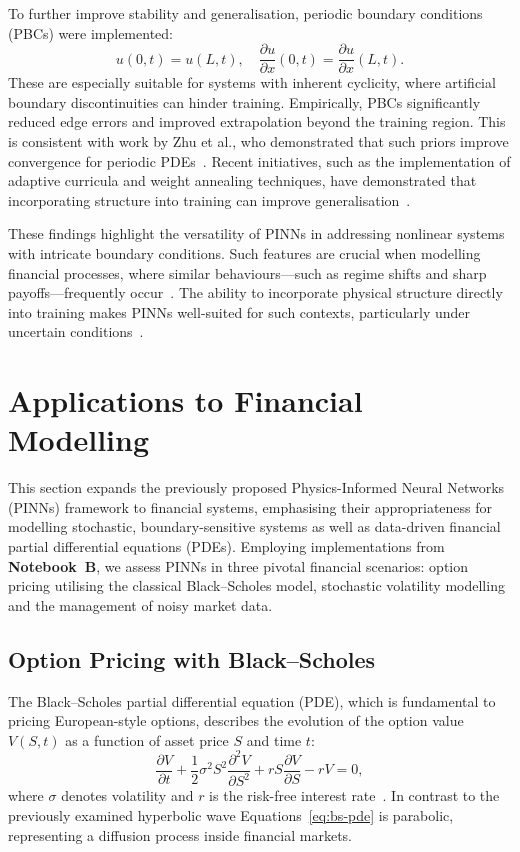 \documentclass[12pt,a4paper]{article}
\begin{document}
To further improve stability and generalisation, periodic boundary conditions (PBCs) were implemented:
\begin{equation}
u(0,t) = u(L,t),\quad \frac{\partial u}{\partial x}(0,t) = \frac{\partial u}{\partial x}(L,t).
\label{eq:pbc-condition}
\end{equation}
These are especially suitable for systems with inherent cyclicity, where artificial boundary discontinuities can hinder training. Empirically, PBCs significantly reduced edge errors and improved extrapolation beyond the training region. This is consistent with work by Zhu et al., who demonstrated that such priors improve convergence for periodic PDEs~\cite{zhu2022periodic}. Recent initiatives, such as the implementation of adaptive curricula and weight annealing techniques, have demonstrated that incorporating structure into training can improve generalisation~\cite{goswami2022adaptive, jagtap2020adaptive}.

These findings highlight the versatility of PINNs in addressing nonlinear systems with intricate boundary conditions. Such features are crucial when modelling financial processes, where similar behaviours—such as regime shifts and sharp payoffs—frequently occur~\cite{sirignano2018deep}. The ability to incorporate physical structure directly into training makes PINNs well-suited for such contexts, particularly under uncertain conditions~\cite{karniadakis2021physics}.


\section{Applications to Financial Modelling}

This section expands the previously proposed Physics-Informed Neural Networks (PINNs) framework to financial systems, emphasising their appropriateness for modelling stochastic, boundary-sensitive systems as well as data-driven financial partial differential equations (PDEs). Employing implementations from \textbf{Notebook~B}, we assess PINNs in three pivotal financial scenarios: option pricing utilising the classical Black–Scholes model, stochastic volatility modelling and the management of noisy market data.

\subsection{Option Pricing with Black–Scholes}

The Black–Scholes partial differential equation (PDE), which is fundamental to pricing European-style options, describes the evolution of the option value \( V(S, t) \) as a function of asset price \( S \) and time \( t \):
\begin{equation}
\frac{\partial V}{\partial t} + \frac{1}{2}\sigma^2 S^2 \frac{\partial^2 V}{\partial S^2} + r S \frac{\partial V}{\partial S} - r V = 0,
\label{eq:bs-pde}
\end{equation}
where \(\sigma\) denotes volatility and \(r\) is the risk-free interest rate~\cite{black1973pricing}. In contrast to the previously examined hyperbolic wave Equations~\eqref{eq:bs-pde} is parabolic, representing a diffusion process inside financial markets.
\end{document}
